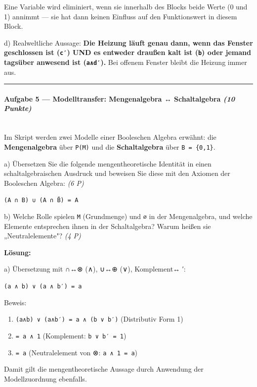 \documentclass[11pt, a4paper]{article}
\begin{document}
Eine Variable wird eliminiert, wenn sie innerhalb des Blocks beide Werte (0 und 1) annimmt — sie hat dann keinen Einfluss auf den Funktionswert in diesem Block.


d) Realweltliche Aussage: \textbf{Die Heizung läuft genau dann, wenn das Fenster geschlossen ist (\texttt{c′}) UND es entweder draußen kalt ist (\texttt{b}) oder jemand tagsüber anwesend ist (\texttt{a∧d′}).} Bei offenem Fenster bleibt die Heizung immer aus.



\noindent\textcolor{rulegray}{\rule{\linewidth}{0.4pt}}


\paragraph{Aufgabe 5 — Modelltransfer: Mengenalgebra ↔ Schaltalgebra \textit{(10 Punkte)}}\mbox{}\\[2pt]

Im Skript werden zwei Modelle einer Booleschen Algebra erwähnt: die \textbf{Mengenalgebra} über \texttt{P(M)} und die \textbf{Schaltalgebra} über \texttt{B = \{0,1\}}.


a) Übersetzen Sie die folgende mengentheoretische Identität in einen schaltalgebraischen Ausdruck und beweisen Sie diese mit den Axiomen der Booleschen Algebra: \textit{(6 P)}


\texttt{(A ∩ B) ∪ (A ∩ B̄) = A}


b) Welche Rolle spielen \texttt{M} (Grundmenge) und \texttt{∅} in der Mengenalgebra, und welche Elemente entsprechen ihnen in der Schaltalgebra? Warum heißen sie „Neutralelemente"? \textit{(4 P)}


\textbf{Lösung:}


a) Übersetzung mit ∩↔⊗ (∧), ∪↔⊕ (∨), Komplement↔ ′:


\texttt{(a ∧ b) ∨ (a ∧ b′) = a}


Beweis:

\begin{enumerate}
  \item \texttt{(a∧b) ∨ (a∧b′) = a ∧ (b ∨ b′)} (Distributiv Form 1)
  \item \texttt{= a ∧ 1} (Komplement: \texttt{b ∨ b′ = 1})
  \item \texttt{= a} (Neutralelement von ⊗: \texttt{a ∧ 1 = a})
\end{enumerate}

Damit gilt die mengentheoretische Aussage durch Anwendung der Modellzuordnung ebenfalls.
\end{document}
